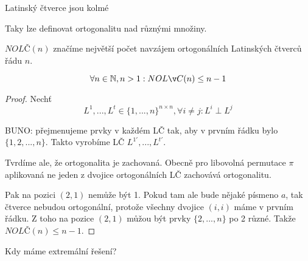 \begin{definition}
	Latinský čtverce jsou kolmé %

	Taky lze definovat ortogonalitu nad různými množiny.
\end{definition}

\begin{notation}
	$NOLČ(n)$ značíme největší počet navzájem ortogonálních Latinských čtverců řádu $n$.
\end{notation}

\begin{theorem}
	\[\forall n \in \N, n > 1: NOLČ(n) \leq n - 1 \]
\end{theorem}
\begin{proof}
	Nechť
	\[L^1, ..., L^t \in \{ 1, ..., n \}^{n \times n}, \forall i \neq j: L^i \perp L^j \]

	BUNO: přejmenujeme prvky v každém LČ tak, aby v prvním řádku bylo $\{ 1, 2, ..., n \}$.
	Takto vyrobíme LČ $L^{1 \prime}, ..., L^{t \prime}$.

	Tvrdíme ale, že ortogonalita je zachovaná.
	Obecně pro libovolná permutace $\pi$ aplikovaná ne jeden z dvojice ortogonálních LČ zachovává ortogonalitu.

	Pak na pozici $(2,1)$ nemůže být 1.
	Pokud tam ale bude nějaké písmeno $a$, tak čtverce nebudou ortogonální, protože všechny dvojice $(i, i)$ máme v prvním řádku.
	Z toho na pozice $(2,1)$ můžou být prvky $\{ 2, ..., n \}$ po 2 různé.
	Takže $NOLČ(n) \leq n - 1 $.
\end{proof}

Kdy máme extremální řešení?

